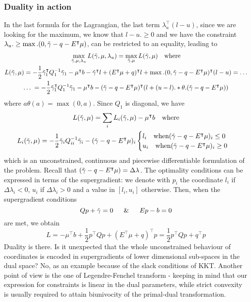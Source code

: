 \documentclass[twoside]{mfitjournal}
\begin{document}
\subsubsection*{Duality in action}
In the last formula for the Lagrangian, the last term $\lambda_u^\intercal(l-u)$, since we are looking for the maximum, we know that $l-u .\ge 0$ and we have the constraint $\lambda_u .\ge \max.(0, \Tilde{\gamma} - q - E^\intercal\mu)$, can be restricted to an equality, leading to 
\begin{gather*}
    \max_{\Tilde{\gamma}, \mu, \lambda_u} L(\Tilde{\gamma}, \mu, \lambda_u) = \max_{\Tilde{\gamma}, \mu} L(\tilde{\gamma}, \mu)  \quad \textrm{where} \\
    L(\tilde{\gamma}, \mu) = -\frac{1}{2} \Tilde{\gamma}_1^\intercal Q_1^{-1}\Tilde{\gamma}_1 - \mu^\intercal b - \Tilde{\gamma}^\intercal l + (E^\intercal\mu + q)^\intercal l + \max.(0, \Tilde{\gamma} - q - E^\intercal\mu)^\intercal(l-u) = \dots \\
    \dots \; = -\frac{1}{2} \Tilde{\gamma}_1^\intercal Q_1^{-1}\Tilde{\gamma}_1 - \mu^\intercal b -  (\Tilde{\gamma} - q - E^\intercal\mu)^\intercal(l + (u-l) .* \theta.(\Tilde{\gamma} - q - E^\intercal\mu))
\end{gather*}
where $a\theta(a) = \max(0, a)$. Since $Q_1$ is diagonal, we have
\begin{gather*}
    L(\tilde{\gamma}, \mu) = \sum_i L_i (\tilde{\gamma}, \mu) - \mu^\intercal b \quad \textrm{where} \\
    L_i (\tilde{\gamma}, \mu) = -\frac{1}{2} \Tilde{\gamma}_i Q_{ii}^{-1}\Tilde{\gamma}_i - (\Tilde{\gamma} - q - E^\intercal\mu)_i \begin{cases}
             l_i \quad \textrm{when} (\Tilde{\gamma} - q - E^\intercal\mu)_i \le 0 \\
             u_i \quad \textrm{when} (\Tilde{\gamma} - q - E^\intercal\mu)_i \ge 0
        \end{cases}
\end{gather*}
which is an unconstrained, continuous and piecewise differentiable formulation of the problem. Recall that $(\Tilde{\gamma} - q - E^\intercal\mu) = \Delta \lambda$.
The optimality conditions can be expressed in terms of the supergradient: we denote with $p_i$ the coordinate $l_i$ if $\Delta\lambda_i < 0$, $u_i$ if $\Delta\lambda_i > 0$ and a value in $[l_i, u_i]$ otherwise. Then, when the supergradient conditions
\[
    Q p + \Tilde{\gamma} = 0 \quad \And \quad E p - b = 0
\]
are met, we obtain 
\[
L = -\mu^\intercal b + \frac{1}{2}p^\intercal Q p + (E^\intercal\mu + q)^\intercal p = \frac{1}{2}p^\intercal Q p + q^\intercal p
\]
Duality is there.
Is it unexpected that the whole unconstrained behaviour of coordinates is encoded in supergradients of lower dimensional sub-spaces in the dual space? No, as an example because of the slack conditions of KKT. Another point of view is the one of Legendre-Fenchel transform - keeping in mind that our expression for constraints is linear in the dual parameters, while strict convexity is usually required to attain biunivocity of the primal-dual transformation.
\end{document}
